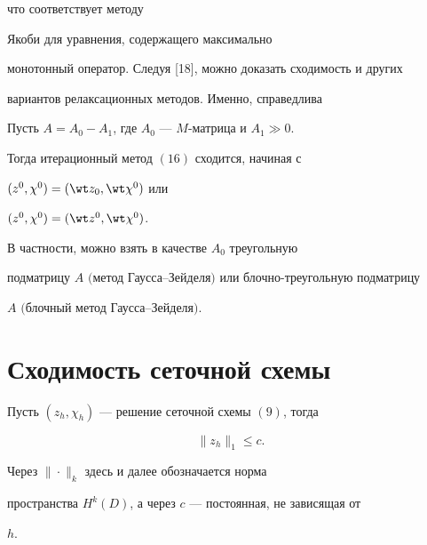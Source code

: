 что соответствует методу


Якоби для уравнения, содержащего максимально


монотонный оператор. Следуя [18], можно доказать сходимость и других


вариантов релаксационных методов. Именно, справедлива





\begin{lem}


Пусть $A=A_0-A_1$, где $A_0$ --- $M$-матрица и $A_1\gg0$.


Тогда итерационный метод $(16)$ сходится, начиная с


$(z^0,\chi^0)=(\wt z_0,\wt \chi^0)$ или


$(z^0,\chi^0)=(\wt z^0,\wt \chi^0)$.


В частности, можно взять в качестве $A_0$ треугольную


подматрицу $A$ $($метод Гаусса--Зейделя$)$ или блочно-треугольную подматрицу


$A$ $($блочный метод Гаусса--Зейделя$)$.


\end{lem}





\section{Сходимость сеточной схемы}





\begin{lem}


Пусть $(z_h,\chi_h)$ --- решение сеточной схемы $(9)$, тогда


\begin{equation}\label{17}


\| z_h \|_1 \leq c.


\end{equation}


\end{lem}





Через $\|\cdot\|_k$ здесь и далее обозначается норма


пространства $ H^k(D) $, а через $c$ --- постоянная, не зависящая от


$h$.





